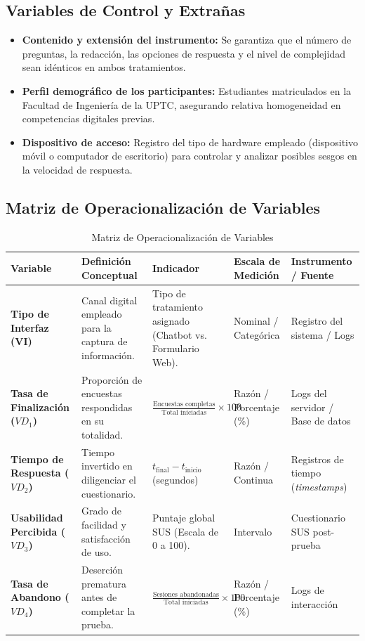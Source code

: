 \documentclass[12pt,letterpaper]{article}
\begin{document}
\subsection{Variables de Control y Extrañas}

\begin{itemize}
    \item \textbf{Contenido y extensión del instrumento:} Se garantiza que el número de preguntas, la redacción, las opciones de respuesta y el nivel de complejidad sean idénticos en ambos tratamientos.
    \item \textbf{Perfil demográfico de los participantes:} Estudiantes matriculados en la Facultad de Ingeniería de la UPTC, asegurando relativa homogeneidad en competencias digitales previas.
    \item \textbf{Dispositivo de acceso:} Registro del tipo de hardware empleado (dispositivo móvil o computador de escritorio) para controlar y analizar posibles sesgos en la velocidad de respuesta.
\end{itemize}

\subsection{Matriz de Operacionalización de Variables}

\begin{table}[htbp]
\centering
\caption{Matriz de Operacionalización de Variables}
\label{tab:operacionalizacion}
\small
\begin{tabular}{|p{3cm}|p{3.5cm}|p{3.5cm}|p{2.5cm}|p{2.5cm}|}
\hline
\textbf{Variable} & \textbf{Definición Conceptual} & \textbf{Indicador} & \textbf{Escala de Medición} & \textbf{Instrumento / Fuente} \\ \hline
\textbf{Tipo de Interfaz (VI)} & Canal digital empleado para la captura de información. & Tipo de tratamiento asignado (Chatbot vs. Formulario Web). & Nominal / Categórica & Registro del sistema / Logs \\ \hline
\textbf{Tasa de Finalización ($VD_1$)} & Proporción de encuestas respondidas en su totalidad. & $\frac{\text{Encuestas completas}}{\text{Total iniciadas}} \times 100$ & Razón / Porcentaje (\%) & Logs del servidor / Base de datos \\ \hline
\textbf{Tiempo de Respuesta ($VD_2$)} & Tiempo invertido en diligenciar el cuestionario. & $t_{\text{final}} - t_{\text{inicio}}$ (segundos) & Razón / Continua & Registros de tiempo (\textit{timestamps}) \\ \hline
\textbf{Usabilidad Percibida ($VD_3$)} & Grado de facilidad y satisfacción de uso. & Puntaje global SUS (Escala de 0 a 100). & Intervalo & Cuestionario SUS post-prueba \\ \hline
\textbf{Tasa de Abandono ($VD_4$)} & Deserción prematura antes de completar la prueba. & $\frac{\text{Sesiones abandonadas}}{\text{Total iniciadas}} \times 100$ & Razón / Porcentaje (\%) & Logs de interacción \\ \hline
\end{tabular}
\end{table}
\end{document}
